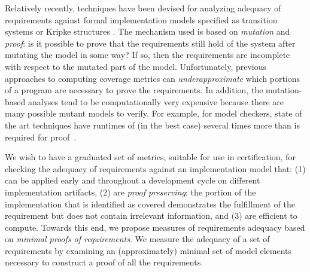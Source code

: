 Relatively recently, techniques have been devised for analyzing adequacy of requirements against formal implementation models specified as transition systems or Kripke structures \cite{chockler2001practical,das2005formal, claessen2007coverage, grosse2007estimating}.  %
The mechanism used is based on {\em mutation} and {\em proof}: is it possible to prove that the requirements still hold of the system after mutating the model in some way?  If so, then the requirements are incomplete with respect to the mutated part of the model.
%
Unfortunately, previous approaches to computing coverage metrics can {\em underapproximate} which portions of a program are necessary to prove the requirements. %
In addition, the mutation-based analyses tend to be computationally very expensive because there are many possible mutant models to verify.  For example, for model checkers, state of the art techniques have runtimes of (in the best case) several times more than is required for proof~\cite{chockler2010coverage}.

We wish to have a graduated set of metrics, suitable for use in certification, for checking the adequacy of requirements against an implementation model that:
    (1) can be applied early and throughout a development cycle on different implementation artifacts,
    (2) are {\em proof preserving}: the portion of the implementation that is identified as covered demonstrates the
        fulfillment of the requirement but does not contain irrelevant information, and
    (3) are efficient to compute.
%
Towards this end, we propose measures of requirements adequacy based on {\em minimal proofs of requirements}.  We measure the adequacy of a set of requirements by examining an (approximately) minimal set of model elements necessary to construct a proof of all the requirements.

